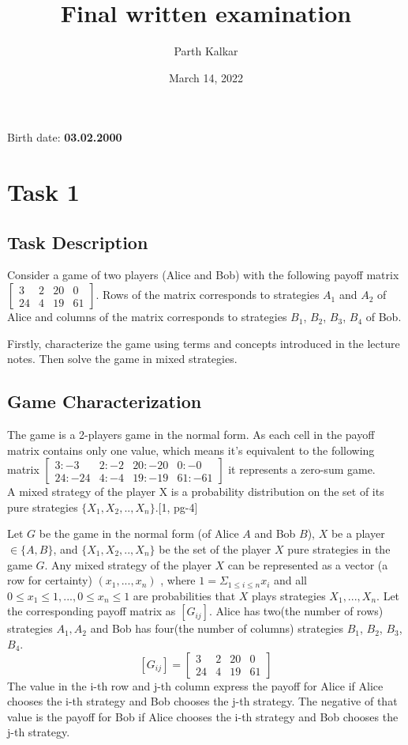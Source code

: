 \documentclass{article}
\title{Final written examination}
\author{Parth Kalkar}
\date{March 14, 2022}
\begin{document}
\maketitle
Birth date: \textbf{03.02.2000} 

\section{Task 1}
\subsection{Task Description}
Consider a game of two players (Alice and Bob) with the following payoff matrix 
$
\begin{bmatrix}
3 & 2 & 20 & 0\\
24 & 4 & 19 & 61
\end{bmatrix}
$. Rows of the matrix
corresponds to strategies $A_1$ and $A_2$ of Alice and columns 
of the matrix corresponds 
to strategies $B_1$, $B_2$, $B_3$, $B_4$ of Bob.

Firstly, characterize the game using terms and concepts introduced in the lecture notes. Then
solve the game in mixed strategies.
\subsection{Game Characterization}
The game is a 2-players game in the normal form.
As each cell in the payoff matrix contains only one value, which means it's equivalent to the following matrix $
\begin{bmatrix}
3:-3 & 2:-2 & 20:-20 & 0:-0\\
24:-24 & 4:-4 & 19:-19 & 61:-61
\end{bmatrix}
$ it represents a zero-sum game. \\

A mixed strategy of the player X is a probability distribution on the set of
its pure strategies $\{X_1, X_2, .., X_n\}$.[1, pg-4]

Let $G$ be the game in the normal form (of Alice $A$ and Bob $B$), $X$ be a player $\in \{A, B\}$, and $\{X_1, X_2, .., X_n\}$ be the set of the player $X$ pure
strategies in the game $G$. 
Any mixed strategy of the player $X$ can be represented as a vector (a
row for certainty) $(x_1, ..., x_n)$ , where $1 = \Sigma_{1 \leq i \leq n} x_i$ and all $0 \leq x_1 \leq 1, ..., 0 \leq x_n \leq 1$ are probabilities that $X$ plays strategies $X_1, ..., X_n$. Let the corresponding payoff matrix as $[G_{ij}]$. Alice has two(the number of rows) strategies $A_1, A_2$ and Bob has four(the number of columns) strategies $B_1$, $B_2$, $B_3$, $B_4$.
$$
[G_{ij}] = 
\begin{bmatrix}
3 & 2 & 20 & 0\\
24 & 4 & 19 & 61
\end{bmatrix}
$$
The value in the i-th row and j-th column express the payoff for Alice if Alice chooses the i-th strategy and Bob
chooses the j-th strategy. The negative of that value is the payoff for Bob if Alice chooses the i-th strategy and Bob
chooses the j-th strategy.
\end{document}
